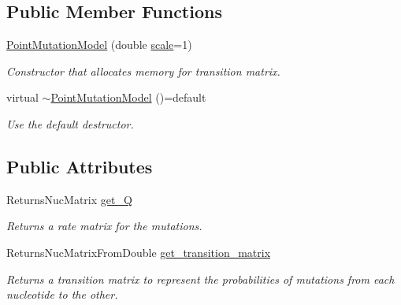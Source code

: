 \subsection*{Public Member Functions}
\begin{DoxyCompactItemize}
\item 
\mbox{\label{classrcombinator_1_1PointMutationModel_a4c83f671b3d76f8cf39ae5b5a1be658e}} 
\mbox{\hyperlink{classrcombinator_1_1PointMutationModel_a4c83f671b3d76f8cf39ae5b5a1be658e}{Point\+Mutation\+Model}} (double \mbox{\hyperlink{classrcombinator_1_1PointMutationModel_a328a30a438bb1b6a625faa3f714a85c8}{scale}}=1)
\begin{DoxyCompactList}\small\item\em Constructor that allocates memory for transition matrix. \end{DoxyCompactList}\item 
virtual \mbox{\hyperlink{classrcombinator_1_1PointMutationModel_a8e21c6b161e6c42d593bdffb3265d701}{$\sim$\+Point\+Mutation\+Model}} ()=default
\begin{DoxyCompactList}\small\item\em Use the default destructor. \end{DoxyCompactList}\end{DoxyCompactItemize}
\subsection*{Public Attributes}
\begin{DoxyCompactItemize}
\item 
Returns\+Nuc\+Matrix \mbox{\hyperlink{classrcombinator_1_1PointMutationModel_a6c6e94bfbf16c3893068e3db1597e941}{get\+\_\+Q}}
\begin{DoxyCompactList}\small\item\em Returns a rate matrix for the mutations. \end{DoxyCompactList}\item 
Returns\+Nuc\+Matrix\+From\+Double \mbox{\hyperlink{classrcombinator_1_1PointMutationModel_a5f17e2f93b22723721a4d04ac2c77aaa}{get\+\_\+transition\+\_\+matrix}}
\begin{DoxyCompactList}\small\item\em Returns a transition matrix to represent the probabilities of mutations from each nucleotide to the other. \end{DoxyCompactList}\end{DoxyCompactItemize}
